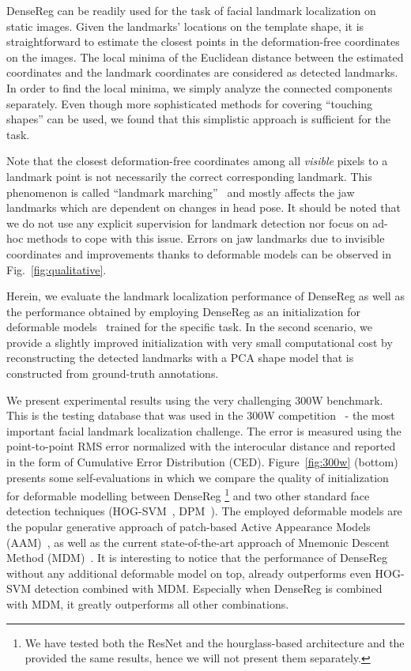 DenseReg can be readily used for the task of facial landmark localization on static images. Given the landmarks' locations on the template shape, it is straightforward to estimate the closest points in the deformation-free coordinates on the images. The local minima of the Euclidean distance between the estimated coordinates and the landmark coordinates are considered as detected landmarks. In order to find the local minima, we simply analyze the connected components separately. Even though more sophisticated methods for covering ``touching shapes'' can be used, we found that this simplistic approach is sufficient for the task. 

Note that the closest deformation-free coordinates among all \emph{visible} pixels to a landmark point is not necessarily the correct corresponding landmark. This phenomenon is called ``landmark marching''~\citep{zhu2015high} and mostly affects the jaw landmarks which are dependent on changes in head pose. It should be noted that we do not use any explicit supervision for landmark detection nor focus on ad-hoc methods to cope with this issue. Errors on jaw landmarks due to invisible coordinates and improvements thanks to deformable models can be observed in Fig.~\ref{fig:qualitative}.

Herein, we evaluate the landmark localization performance of DenseReg as well as the performance obtained by employing DenseReg as an initialization for deformable models~\citep{papandreou2008adaptive,tzimiropoulos2014gauss,antonakos2015feature,trigeorgis2016mnemonic} trained for the specific task. In the second scenario, we provide a slightly improved initialization with very small computational cost by reconstructing the detected landmarks with a PCA shape model that is constructed from ground-truth annotations. 


We present experimental results using the very challenging 300W benchmark. This is the testing database that was used in the 300W competition~\citep{sagonas_iccv_300w_2013,sagonas2016300} - the most important facial landmark localization challenge. The error is measured using the point-to-point RMS error normalized with the interocular distance and reported in the form of Cumulative Error Distribution (CED). Figure~\ref{fig:300w} (bottom) presents some self-evaluations in which we compare the quality of initialization for deformable modelling between DenseReg \footnote{We have tested both the ResNet and the hourglass-based architecture and the provided the same results, hence we will not present them separately.} and two other standard face detection techniques (HOG-SVM~\citep{king2015max}, DPM~\citep{mathias2014face}). The employed deformable models are the popular generative approach of patch-based Active Appearance Models (AAM)~\citep{papandreou2008adaptive,tzimiropoulos2014gauss,antonakos2015feature}, as well as the current state-of-the-art approach of Mnemonic Descent Method (MDM)~\citep{trigeorgis2016mnemonic}. It is interesting to notice that the performance of DenseReg without any additional deformable model on top, already outperforms even HOG-SVM detection combined with MDM. Especially when DenseReg is combined with MDM, it greatly outperforms all other combinations. 


